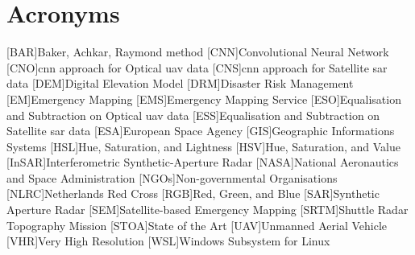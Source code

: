 \chapter*{Acronyms}

\begin{acronym}[UML]
  [BAR]{Baker, Achkar, Raymond method}
  [CNN]{Convolutional Neural Network}
  [CNO]{\ac{cnn} approach for Optical \ac{uav} data}
  [CNS]{\ac{cnn} approach for Satellite \ac{sar} data}
  [DEM]{Digital Elevation Model}
  [DRM]{Disaster Risk Management}
  [EM]{Emergency Mapping}
  [EMS]{Emergency Mapping Service}
  [ESO]{Equalisation and Subtraction on Optical \ac{uav} data}
  [ESS]{Equalisation and Subtraction on Satellite \ac{sar} data}
  [ESA]{European Space Agency}
  [GIS]{Geographic Informations Systems}
  [HSL]{Hue, Saturation, and Lightness}
  [HSV]{Hue, Saturation, and Value}
  [InSAR]{Interferometric Synthetic-Aperture Radar}
  [NASA]{National Aeronautics and Space Administration}
  [NGOs]{Non-governmental Organisations}
  [NLRC]{Netherlands Red Cross}
  [RGB]{Red, Green, and Blue}
  [SAR]{Synthetic Aperture Radar}
  [SEM]{Satellite-based Emergency Mapping}
  [SRTM]{Shuttle Radar Topography Mission}
  [STOA]{State of the Art}
  [UAV]{Unmanned Aerial Vehicle}
  [VHR]{Very High Resolution}
  [WSL]{Windows Subsystem for Linux}
\end{acronym}